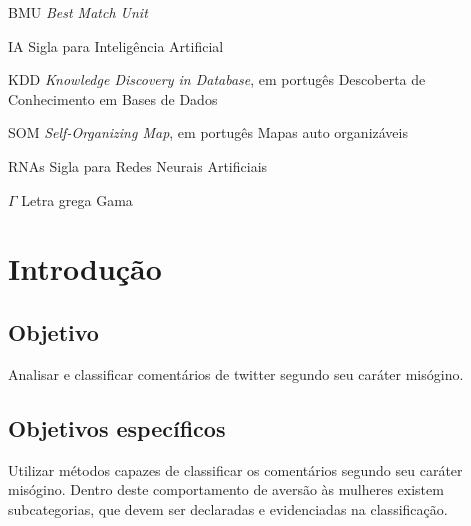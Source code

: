 \documentclass[
	12pt,				%
	openright,			%
	twoside,			%
	a4paper,			%
	english,			%
	french,				%
	spanish,			%
	brazil				%
	]{abntex2}
\begin{document}
\listoftables*

\cleardoublepage

\begin{siglas}
  \item[BMU] \emph{Best Match Unit}  	
  \item[IA] Sigla para Inteligência Artificial
  \item[KDD] \emph{Knowledge Discovery in Database}, em portugês Descoberta de Conhecimento em Bases de Dados
  \item[SOM] \emph{Self-Organizing Map}, em portugês Mapas auto organizáveis
  \item[RNAs] Sigla para Redes Neurais Artificiais
  
  
\end{siglas}

\begin{simbolos}
  \item[$ \Gamma $] Letra grega Gama
  
\end{simbolos}

\tableofcontents*
\cleardoublepage



\textual

\chapter{Introdução}

\section{Objetivo}
Analisar e classificar comentários de twitter segundo seu caráter misógino.
\section{Objetivos específicos}
Utilizar métodos capazes de classificar os comentários segundo seu caráter misógino.
Dentro deste comportamento de aversão às mulheres existem subcategorias, que devem ser declaradas e evidenciadas na classificação.
\end{document}
